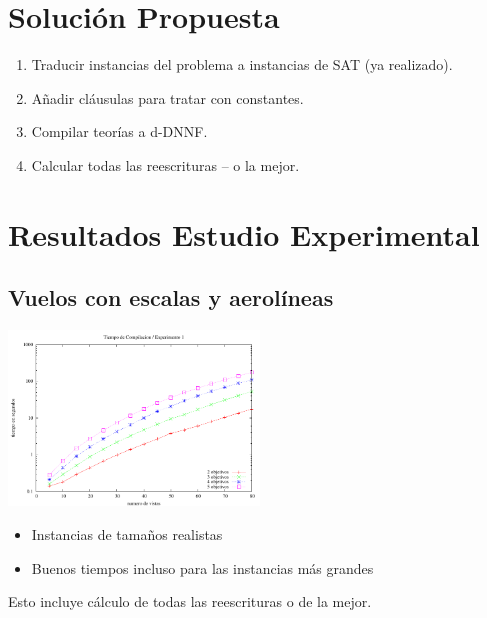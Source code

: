 \documentclass{beamer}
\begin{document}

\frame
{
\section{Solución Propuesta}
\begin{enumerate}
\item Traducir instancias del problema a instancias de SAT (ya realizado).
\item Añadir cláusulas para tratar con constantes.
\item Compilar teorías a d-DNNF.
\item Calcular todas las reescrituras -- o la mejor.
\end{enumerate}
}


\section{Resultados Estudio Experimental}

\subsection{Vuelos con escalas y aerolíneas}
\frame
{

\begin{center}
\includegraphics[width=0.5\textwidth]{plot1}
\end{center}

\begin{itemize}
\item Instancias de tamaños realistas
\item Buenos tiempos incluso para las instancias más grandes
\end{itemize}

Esto incluye cálculo de todas las reescrituras o de la mejor.
}
\end{document}
